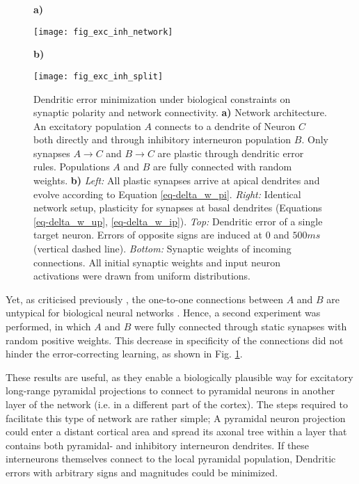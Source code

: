 \begin{figure}[t]
    \centering
    \begin{minipage}{0.2\textwidth}
        \textbf{a)}\par\medskip
        \centering
        \texttt{[image: fig\_exc\_inh\_network]}
    \end{minipage}\hfill
    \begin{minipage}{0.7\textwidth}
        \textbf{b)}\par\medskip
        \centering
        \texttt{[image: fig\_exc\_inh\_split]}
    \end{minipage}
    \caption{Dendritic error minimization under biological constraints on synaptic polarity and network connectivity.
        \textbf{a)} Network architecture. An excitatory population $A$ connects to a dendrite of Neuron $C$ both
        directly and through inhibitory interneuron population $B$. Only synapses $A\rightarrow C$ and $B \rightarrow C$
        are plastic through dendritic error rules. Populations $A$ and $B$ are fully connected with random weights.
        \textbf{b)} \textit{Left:} All plastic synapses arrive at apical dendrites and evolve according to Equation
        \ref{eq-delta_w_pi}. \textit{Right:} Identical network setup, plasticity for synapses at basal dendrites
        (Equations \ref{eq-delta_w_up}, \ref{eq-delta_w_ip}). \textit{Top:} Dendritic error of a single target neuron.
        Errors of opposite signs are induced at $0$ and $500ms$ (vertical dashed line). \textit{Bottom:} Synaptic
        weights of incoming connections. All initial synaptic weights and input neuron activations were drawn from
        uniform distributions.}
    \label{fig-exc-inh-split}
\end{figure}

Yet, as criticised previously \citep{whittington2019theories}, the one-to-one connections between $A$ and $B$ are
untypical for biological neural networks \citeme. Hence, a second experiment was performed, in which $A$ and $B$ were
fully connected through static synapses with random positive weights. This decrease in specificity of the connections
did not hinder the error-correcting learning, as shown in Fig. \ref{fig-exc-inh-split}.

These results are useful, as they enable a biologically plausible way for excitatory long-range pyramidal projections to
connect to pyramidal neurons in another layer of the network (i.e. in a different part of the cortex). The steps
required to facilitate this type of network are rather simple; A pyramidal neuron projection could enter a distant
cortical area and spread its axonal tree \phrasing within a layer that contains both pyramidal- and inhibitory
interneuron dendrites. If these interneurons themselves connect to the local pyramidal population, Dendritic errors with
arbitrary signs and magnitudes could be minimized.

